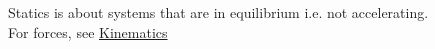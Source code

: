 \documentclass[class=article, crop=false]{standalone}
\begin{document}
Statics is about systems that are in equilibrium i.e. not accelerating. \\
For forces, see \href{https://github.com/Jex-y/ALevelFurtherMathsNotes/blob/master/output/Mechanics/Kinematics.pdf}{Kinematics}
\end{document}
